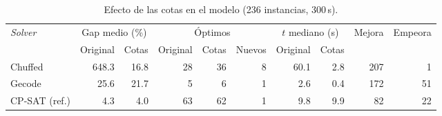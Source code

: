 \begin{table}[H]
  \centering
  \small
  \singlespacing
  \caption{Efecto de las cotas en el modelo (236 instancias, 300\,s).}
  \label{tab:efecto_cotas}
  \begin{tabular}{lrrrrrrrrr}
    \toprule
    \textit{Solver} & \multicolumn{2}{c}{Gap medio (\%)} & \multicolumn{3}{c}{Óptimos} & \multicolumn{2}{c}{$t$ mediano (s)} & Mejora & Empeora \\
    \cmidrule(lr){2-3}\cmidrule(lr){4-6}\cmidrule(lr){7-8}
     & Original & Cotas & Original & Cotas & Nuevos & Original & Cotas &  &  \\
    \midrule
    Chuffed & 648.3 & 16.8 & 28 & 36 & 8 & 60.1 & 2.8 & 207 & 1 \\
    Gecode & 25.6 & 21.7 & 5 & 6 & 1 & 2.6 & 0.4 & 172 & 51 \\
    CP-SAT (ref.) & 4.3 & 4.0 & 63 & 62 & 1 & 9.8 & 9.9 & 82 & 22 \\
    \bottomrule
  \end{tabular}
  \par{}
\end{table}
